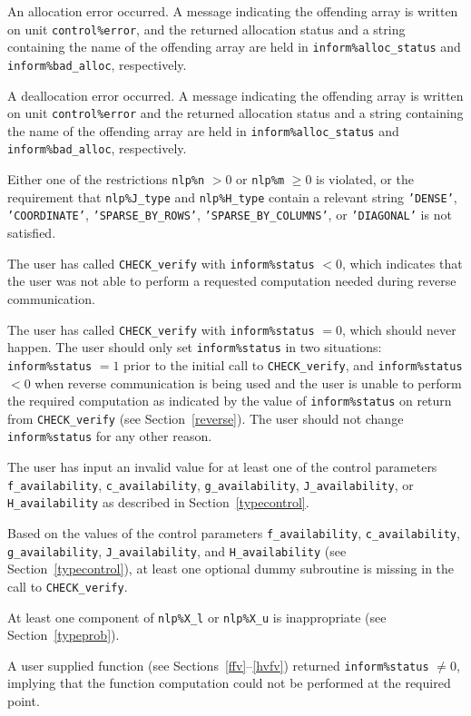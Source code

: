 \documentclass{galahad}
\newcommand{\packagename}{CHECK}
\begin{document}
\begin{description}

 An allocation error occurred. 
A message indicating the offending
array is written on unit {\tt control\%error}, and the returned allocation 
status and a string containing the name of the offending array
are held in {\tt inform\%alloc\_\-status}
and {\tt inform\%bad\_alloc}, respectively.

 A deallocation error occurred. 
A message indicating the offending 
array is written on unit {\tt control\%error} and the returned allocation 
status and a string containing the name of the offending array
are held in {\tt inform\%alloc\_\-status}
and {\tt inform\%bad\_alloc}, respectively.

Either one of the restrictions {\tt nlp\%n} $> 0$ or {\tt nlp\%m}
$\geq 0$ is violated, or the
requirement that {\tt nlp\%J\_type} and {\tt nlp\%H\_type} contain
a relevant string
{\tt 'DENSE'}, {\tt 'COORDINATE'}, {\tt 'SPARSE\_BY\_ROWS'},
{\tt 'SPARSE\_BY\_COLUMNS'}, or {\tt 'DIAGONAL'}
is not satisfied.

The user has called {\tt \packagename\_verify} with {\tt inform\%status}
$< 0$, which indicates that the user was not able to perform a
requested computation needed during reverse communication.

The user has called {\tt \packagename\_verify} with
{\tt inform\%status} $= 0$, which should never happen.  The user
should only set {\tt inform\%status} in two situations: {\tt inform\%status}
$= 1$ prior to the initial call to {\tt \packagename\_verify}, and
{\tt inform\%status} $< 0$ when reverse communication is being used
and the user is unable to perform the required computation as
indicated by the value of {\tt inform\%status} on return from {\tt \packagename\_verify} (see
Section~\ref{reverse}). The user should not
change {\tt inform\%status} for any other reason.

The user has input an invalid value for at least one of the control
parameters
{\tt f\_availability}, {\tt c\_availability}, {\tt g\_availability},
{\tt J\_availability}, or {\tt H\_availability} as described in
Section~\ref{typecontrol}.

Based on the values of the control parameters
{\tt f\_availability}, {\tt c\_availability}, {\tt g\_availability},
{\tt J\_availa\-bility}, and {\tt H\_availability} (see Section~\ref{typecontrol}), at least one 
optional dummy subroutine is missing in the call to {\tt \packagename\_verify}.

At least one component of {\tt nlp\%X\_l} or {\tt nlp\%X\_u} is
inappropriate (see Section~\ref{typeprob}).

A user supplied function (see Sections~\ref{ffv}--\ref{hvfv}) returned {\tt inform\%status} $\neq 0$,
implying that the function computation could not be performed at the required point. 

\end{description}
\end{document}
